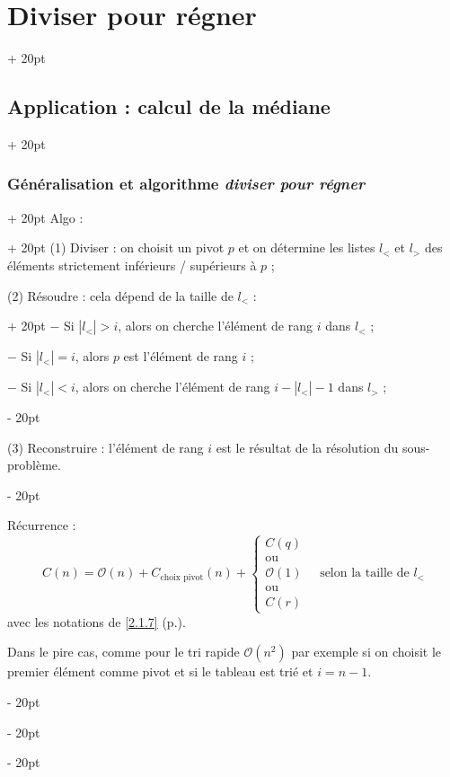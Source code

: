 \documentclass[a4paper, 12pt, twoside]{article}
\newcommand{\abs}[1]{\left\lvert #1 \right\rvert} %
\newcommand{\ind}[1][20pt]{\advance\leftskip + #1}
\newcommand{\deind}[1][20pt]{\advance\leftskip - #1}
\newenvironment{indt}[2][20pt]{#2 \par \ind[#1]}{\par \deind} %
\begin{document}
\begin{indt}{\section{Diviser pour régner}}
\begin{indt}{\subsection{Application : calcul de la médiane}}
\begin{indt}{\subsubsection{Généralisation et algorithme \textit{diviser pour régner}}}
                \begin{indt}{Algo :}
                    (1) Diviser : on choisit un pivot $p$ et on détermine les listes $l_<$ et $l_>$ des éléments strictement inférieurs / supérieurs à $p$ ;
                    
                    \begin{indt}{(2) Résoudre : cela dépend de la taille de $l_<$ :}
                        $-$ Si $\abs{l_<} > i$, alors on cherche l'élément de rang $i$ dans $l_<$ ;
                        
                        $-$ Si $\abs{l_<} = i$, alors $p$ est l'élément de rang $i$ ;
                        
                        $-$ Si $\abs{l_<} < i$, alors on cherche l'élément de rang $i - \abs{l_<} - 1$ dans $l_>$ ;
                    \end{indt}
                    
                    (3) Reconstruire : l'élément de rang $i$ est le résultat de la résolution du sous-problème.
                \end{indt}
                
                \vspace{6pt}
                
                Récurrence :
                    \[
                        C(n) =
                        \mathcal O(n)
                        + C_{\text{choix pivot}}(n)
                        +
                        \begin{cases}
                            C(q)
                            \\
                            \text{ou}
                            \\
                            \mathcal O(1)
                            \\
                            \text{ou}
                            \\
                            C(r)
                        \end{cases}
                        \quad \text{selon la taille de $l_<$}
                    \]
                avec les notations de \ref{2.1.7} (p.\pageref{2.1.7}).
                
                \vspace{12pt}
                
                Dans le pire cas, comme pour le tri rapide $\mathcal O(n^2)$ par exemple si on choisit le premier élément comme pivot et si le tableau est trié et $i = n - 1$.
                

\end{indt}
\end{indt}
\end{indt}
\end{document}
